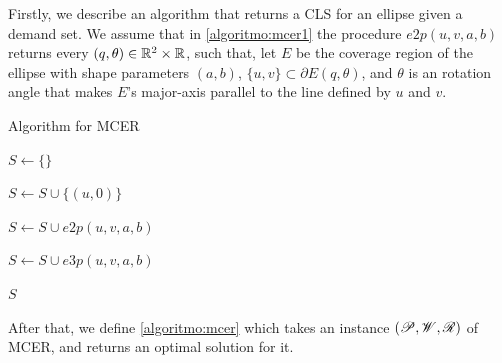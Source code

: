 Firstly, we describe an algorithm that returns a CLS for an ellipse given a demand set. 
We assume that in \autoref{algoritmo:mcer1} the procedure $e2p(u, v, a, b)$ returns every $(q, \theta) \in \mathbb{R}^2\times\mathbb{R}$, such that, let $E$ be the coverage region of the ellipse with shape parameters $(a, b)$, $\{u, v\}\subset \partial E(q, \theta)$, and
$\theta$ is an rotation angle that makes $E$'s major-axis parallel to the line defined by $u$ and $v$.

\begin{algoritmo}
	\caption{Algorithm for MCER}\label{algoritmo:mcer1}
	\begin{algorithmic}[1]
		
		
		\item[]
		
		\State $S \gets \{\}$
		
		\State $S \gets S \cup \{(u, 0)\}$
		\EndFor
		
		\State $S \gets S \cup e2p(u, v, a, b)$
		\EndFor
		
		\State $S \gets S \cup e3p(u, v, a, b)$ 
		\EndFor
		
		\State \Return $S$
		\EndProcedure
	\end{algorithmic}
\end{algoritmo}

After that, we define \autoref{algoritmo:mcer} which takes an instance $(\mathscr{P}, \mathscr{W}, \mathscr{R})$ of MCER, and returns an optimal solution for it.


